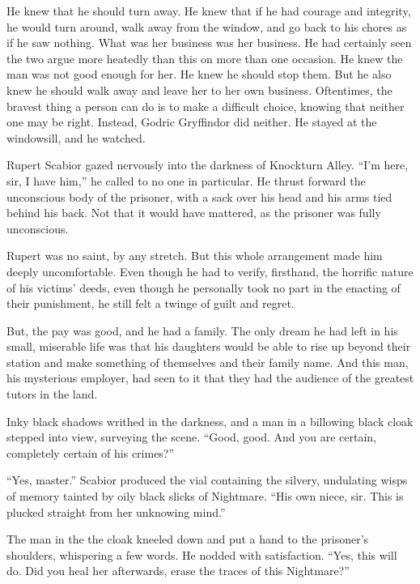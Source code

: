 He knew that he should turn away. He knew that if he had courage and integrity, he would turn around, walk away from the window, and go back to his chores as if he saw nothing. What was her business was her business. He had certainly seen the two argue more heatedly than this on more than one occasion. He knew the man was not good enough for her. He knew he should stop them. But he also knew he should walk away and leave her to her own business. Oftentimes, the bravest thing a person can do is to make a difficult choice, knowing that neither one may be right.
\SomeVSpace
Instead, Godric Gryffindor did neither. He stayed at the windowsill, and he watched.
\simpleline


Rupert Scabior gazed nervously into the darkness of Knockturn Alley. “I’m here, sir, I have him,” he called to no one in particular. He thrust forward the unconscious body of the prisoner, with a sack over his head and his arms tied behind his back. Not that it would have mattered, as the prisoner was fully unconscious.

Rupert was no saint, by any stretch. But this whole arrangement made him deeply uncomfortable. Even though he had to verify, firsthand, the horrific nature of his victims’ deeds, even though he personally took no part in the enacting of their punishment, he still felt a twinge of guilt and regret.

But, the pay was good, and he had a family. The only dream he had left in his small, miserable life was that his daughters would be able to rise up beyond their station and make something of themselves and their family name. And this man, his mysterious employer, had seen to it that they had the audience of the greatest tutors in the land.

Inky black shadows writhed in the darkness, and a man in a billowing black cloak stepped into view, surveying the scene. “Good, good. And you are certain, completely certain of his crimes?”

“Yes, master.” Scabior produced the vial containing the silvery, undulating wisps of memory tainted by oily black slicks of Nightmare. “His own niece, sir. This is plucked straight from her unknowing mind.”

The man in the the cloak kneeled down and put a hand to the prisoner’s shoulders, whispering a few words. He nodded with satisfaction. “Yes, this will do. Did you heal her afterwards, erase the traces of this Nightmare?”


